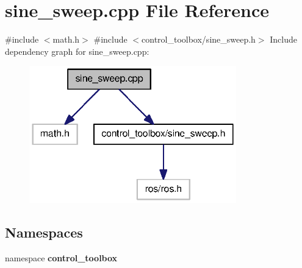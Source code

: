 \section{sine\-\_\-sweep.\-cpp \-File \-Reference}
\label{sine__sweep_8cpp}
{\ttfamily \#include $<$math.\-h$>$}\*
{\ttfamily \#include $<$control\-\_\-toolbox/sine\-\_\-sweep.\-h$>$}\*
\-Include dependency graph for sine\-\_\-sweep.\-cpp\-:
\nopagebreak
\begin{figure}[H]
\begin{center}
\leavevmode
\includegraphics[width=254pt]{sine__sweep_8cpp__incl}
\end{center}
\end{figure}
\subsection*{\-Namespaces}
\begin{DoxyCompactItemize}
\item 
namespace {\bf control\-\_\-toolbox}
\end{DoxyCompactItemize}
